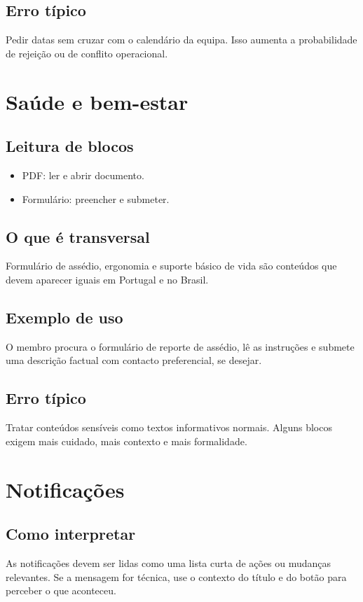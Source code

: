 \subsection{Erro típico}
Pedir datas sem cruzar com o calendário da equipa. Isso aumenta a probabilidade de rejeição ou de conflito operacional.

\section{Saúde e bem-estar}
\subsection{Leitura de blocos}
\begin{itemize}
  \item PDF: ler e abrir documento.
  \item Formulário: preencher e submeter.
\end{itemize}

\subsection{O que é transversal}
Formulário de assédio, ergonomia e suporte básico de vida são conteúdos que devem aparecer iguais em Portugal e no Brasil.

\subsection{Exemplo de uso}
O membro procura o formulário de reporte de assédio, lê as instruções e submete uma descrição factual com contacto preferencial, se desejar.

\subsection{Erro típico}
Tratar conteúdos sensíveis como textos informativos normais. Alguns blocos exigem mais cuidado, mais contexto e mais formalidade.

\section{Notificações}
\subsection{Como interpretar}
As notificações devem ser lidas como uma lista curta de ações ou mudanças relevantes. Se a mensagem for técnica, use o contexto do título e do botão para perceber o que aconteceu.

